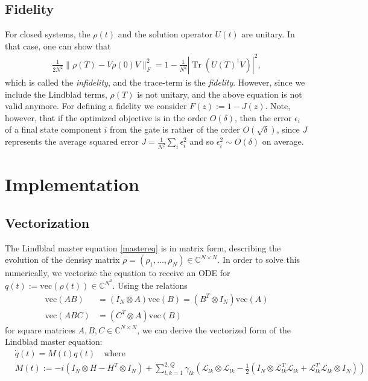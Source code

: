 \documentclass[letterpaper]{article}
\DeclareMathOperator{\Tr}{Tr}
\newcommand{\Ell}{\mathcal{L}}
\newcommand{\C}{\mathds{C}}
\begin{document}
\subsection{Fidelity} 
For closed systems, the $\rho(t)$ and the solution operator $U(t)$ are unitary. In that case, one can show that 
\begin{align}
  \frac{1}{2N^2}\|\rho(T) - V\rho(0)V\|_F^2 = 1 - \frac{1}{N^2}|\Tr(U(T)^{\dagger}V)|^2,
\end{align}
which is called the \textit{infidelity}, and the trace-term is the \textit{fidelity}. However, since we include the Lindblad terms, $\rho(T)$ is not unitary, and the above equation is not valid anymore. For defining a fidelity we consider $F(z) := 1 - J(z)$. Note, however, that if the optimized objective is in the order $O(\delta)$, then the error $\epsilon_i$ of a final state component $i$ from the gate is rather of the order $O(\sqrt{\delta})$, since $J$ represents the average squared error $J = \frac{1}{N^2}\sum_i \epsilon_i^2$ and so $\epsilon_i^2 \sim O(\delta)$ on average.

\section{Implementation}

  \subsection{Vectorization}
  The Lindblad master equation \eqref{mastereq} is in matrix form, describing the evolution of the densisy matrix $\rho = (\rho_1, \dots, \rho_N) \in \C^{N\times N}$. In order to solve this numerically, we vectorize the equation to receive an ODE for $q(t) := \text{vec}(\rho(t)) \in \C^{N^2}$. Using the relations
  \begin{align}
   \text{vec}(AB) &= (I_N\otimes A)\text{vec}(B) = (B^T\otimes I_N)\text{vec}(A) \\
   \text{vec}(ABC) &= (C^T\otimes A)\text{vec}(B)
  \end{align}
  for square matrices $A,B,C\in\C^{N\times N}$, we can derive the vectorized form of the Lindblad master equation:
  \begin{align}\label{mastereq_vectorized}
    &\dot q(t) = M(t) q(t) \quad  \text{where} \\
    &M(t) := -i(I_N\otimes H - H^T \otimes I_N) + \sum_{l,k=1}^{2,Q} \gamma_{lk} \left( \Ell_{lk}\otimes \Ell_{lk} - \frac 1 2 \left( I_N\otimes \Ell^T_{lk}\Ell_{lk} + \Ell^T_{lk}\Ell_{lk} \otimes I_N \right) \right)
  \end{align}
\end{document}
